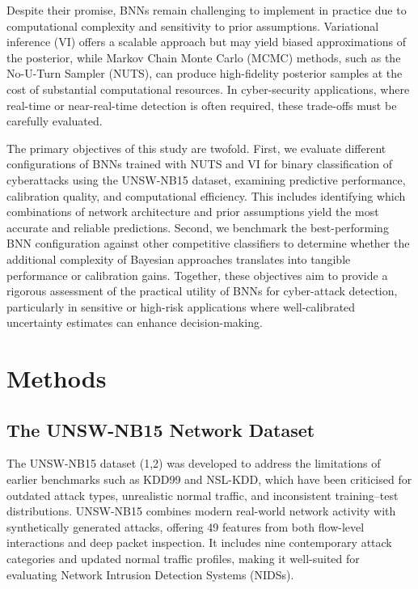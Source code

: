 \documentclass[
  a4paper,
]{scrreprt}
\begin{document}
Despite their promise, BNNs remain challenging to implement in practice
due to computational complexity and sensitivity to prior assumptions.
Variational inference (VI) offers a scalable approach but may yield
biased approximations of the posterior, while Markov Chain Monte Carlo
(MCMC) methods, such as the No-U-Turn Sampler (NUTS), can produce
high-fidelity posterior samples at the cost of substantial computational
resources. In cyber-security applications, where real-time or
near-real-time detection is often required, these trade-offs must be
carefully evaluated.

The primary objectives of this study are twofold. First, we evaluate
different configurations of BNNs trained with NUTS and VI for binary
classification of cyberattacks using the UNSW-NB15 dataset, examining
predictive performance, calibration quality, and computational
efficiency. This includes identifying which combinations of network
architecture and prior assumptions yield the most accurate and reliable
predictions. Second, we benchmark the best-performing BNN configuration
against other competitive classifiers to determine whether the
additional complexity of Bayesian approaches translates into tangible
performance or calibration gains. Together, these objectives aim to
provide a rigorous assessment of the practical utility of BNNs for
cyber-attack detection, particularly in sensitive or high-risk
applications where well-calibrated uncertainty estimates can enhance
decision-making.


\chapter{Methods}\label{sec-methods}

\section{The UNSW-NB15 Network
Dataset}\label{the-unsw-nb15-network-dataset}

The UNSW-NB15 dataset (1,2) was developed to address the limitations of
earlier benchmarks such as KDD99 and NSL-KDD, which have been criticised
for outdated attack types, unrealistic normal traffic, and inconsistent
training--test distributions. UNSW-NB15 combines modern real-world
network activity with synthetically generated attacks, offering 49
features from both flow-level interactions and deep packet inspection.
It includes nine contemporary attack categories and updated normal
traffic profiles, making it well-suited for evaluating Network Intrusion
Detection Systems (NIDSs).
\end{document}
